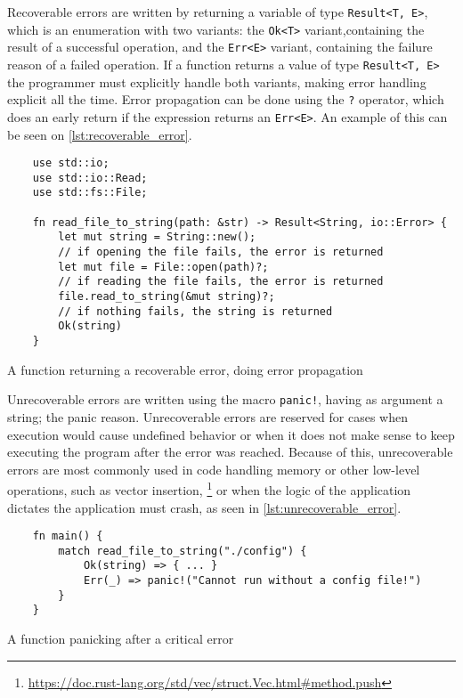 Recoverable errors are written by returning a variable of type \texttt{Result<T,
E>}, which is an enumeration with two variants: the \texttt{Ok<T>}
variant,containing the result of a successful operation, and the \texttt{Err<E>}
variant, containing the failure reason of a failed operation. If a function
returns a value of type \texttt{Result<T, E>} the programmer must explicitly
handle both variants, making error handling explicit all the time. Error
propagation can be done using the \texttt{?} operator, which does an early
return if the expression returns an \texttt{Err<E>}. An example of this can be
seen on \ref{lst:recoverable_error}.

\begin{listing}[ht]
	\begin{verbatim}
    use std::io;
    use std::io::Read;
    use std::fs::File;

    fn read_file_to_string(path: &str) -> Result<String, io::Error> {
        let mut string = String::new();
        // if opening the file fails, the error is returned
        let mut file = File::open(path)?;
        // if reading the file fails, the error is returned
        file.read_to_string(&mut string)?;
        // if nothing fails, the string is returned
        Ok(string)
    }
    \end{verbatim}
  \caption{A function returning a recoverable error, doing error propagation}
  \label{lst:recoverable_error}
\end{listing}

Unrecoverable errors are written using the macro \texttt{panic!}, having as
argument a string; the panic reason. Unrecoverable errors are reserved for cases
when execution would cause undefined behavior or when it does not make sense to
keep executing the program after the error was reached. Because of this,
unrecoverable errors are most commonly used in code handling memory or other
low-level operations, such as vector insertion,
\footnote{\url{https://doc.rust-lang.org/std/vec/struct.Vec.html\#method.push}}
or when the logic of the application dictates the application must crash, as
seen in \ref{lst:unrecoverable_error}.


\begin{listing}[ht]
	\begin{verbatim}
    fn main() {
        match read_file_to_string("./config") {
            Ok(string) => { ... }
            Err(_) => panic!("Cannot run without a config file!")
        }
    }
    \end{verbatim}
  \caption{A function panicking after a critical error}
  \label{lst:unrecoverable_error}
\end{listing}

